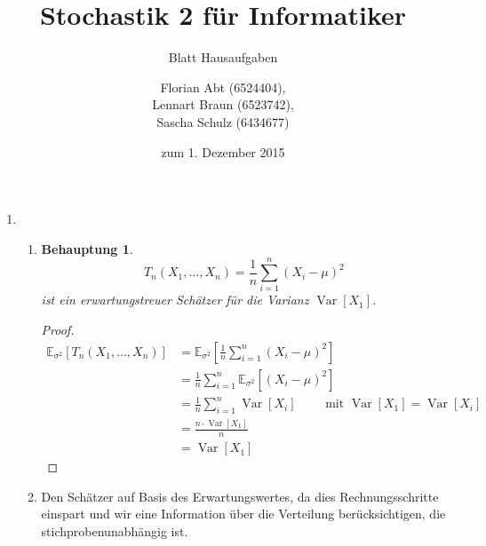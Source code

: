 \documentclass[a4paper]{scrartcl}
\title{Stochastik 2 für Informatiker}
\subtitle{Blatt {\blattnr} Hausaufgaben}
\author{
    Florian Abt (6524404), \\
    Lennart Braun (6523742), \\
    Sascha Schulz (6434677)
}
\date{zum 1. Dezember 2015}
\newtheorem*{behaupt}{Behauptung}
\newcommand{\e}{\mathbb{E}}
\newcommand{\var}{\operatorname{Var}}
\def \blattnr {7}
\begin{document}
\maketitle

\begin{enumerate}[label=\bfseries \blattnr.\arabic*]


\item 
    \begin{enumerate}
        \item 
            \begin{behaupt}
                \begin{equation*}
                    T_n(X_1, \dotsc, X_n) =
                    \frac{1}{n} \sum_{i=1}^n (X_i - \mu)^2
                \end{equation*}
                ist ein erwartungstreuer Schätzer für die Varianz $\var[X_1]$.
            \end{behaupt}
            \begin{proof}
                \begin{equation*}
                    \begin{split}
                        \e_{\sigma^2}[T_n(X_1,\dotsc,X_n)]
                        &= \e_{\sigma^2}\left[\frac1n \sum_{i=1}^n(X_i-\mu)^2\right] \\
                        &= \frac1n \sum_{i=1}^n \e_{\sigma^2} [(X_i-\mu)^2] \\
                        &= \frac1n \sum_{i=1}^n \var[X_i] \qquad \text{ mit } \var[X_1]= \var[X_i] \\
                        &= \frac{n \cdot \var[X_1]}{n} \\
                        &= \var[X_1]
                    \end{split}
                \end{equation*}
            \end{proof}

        \item 
          Den Schätzer auf Basis des Erwartungswertes, da dies
          Rechnungsschritte einspart und wir eine Information über die
          Verteilung berücksichtigen, die stichprobenunabhängig ist.

    \end{enumerate}


\end{enumerate}
\end{document}
